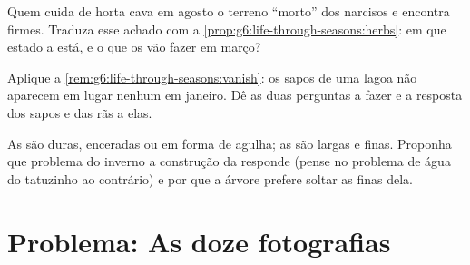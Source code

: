 \begin{exercise}[$\star\star$]\label{exo:g6:life-through-seasons:10}
Quem cuida de horta cava em agosto o terreno ``morto'' dos narcisos e
encontra  firmes. Traduza esse achado com a
\cref{prop:g6:life-through-seasons:herbs}: em que estado a 
está, e o que os  vão fazer em março?
\end{exercise}

\begin{exercise}[$\star\star$]\label{exo:g6:life-through-seasons:11}
Aplique a \cref{rem:g6:life-through-seasons:vanish}: os sapos de uma
lagoa não aparecem em lugar nenhum em janeiro. Dê as duas perguntas a
fazer e a resposta dos sapos e das rãs a elas.
\end{exercise}

\begin{exercise}[$\star\star\star$]\label{exo:g6:life-through-seasons:12}
As   são duras, enceradas ou em forma de agulha; as
  são largas e finas. Proponha que problema do
inverno a construção da   responde (pense no problema
de água do tatuzinho ao contrário) e por que a árvore 
prefere soltar as  finas dela.
\end{exercise}

\section{Problema: As doze fotografias}

